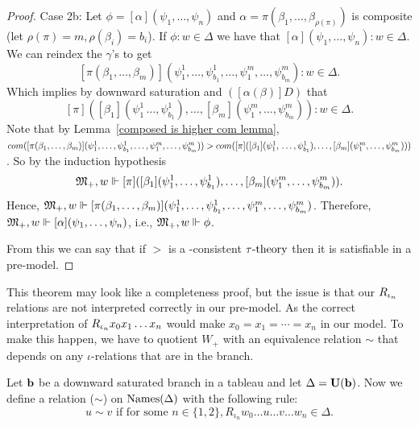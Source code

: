 \begin{proof}
    \par Case 2b: Let $\phi = [\alpha](\psi_1,\ldots,\psi_n)$ and $\alpha=\pi(\beta_1,\ldots,\beta_{\rho(\pi)})$ is composite (let $\rho(\pi)=m, \rho(\beta_i)=b_i$). If $\phi:w\in\Delta$ we have that $[\alpha](\psi_1,\ldots,\psi_n):w\in\Delta$.
    We can reindex the $\gamma$'s to get $$[\pi(\beta_1,\ldots,\beta_{m})](\psi_1^1,\ldots,\psi_{b_1}^1,\ldots,\psi_1^{m},\ldots,\psi_{b_m}^{m}):w\in\Delta.$$ Which implies by downward saturation and $([\alpha(\beta)]D)$ that $$[\pi]([\beta_1](\psi_1^1\,\ldots,\psi_{b_1}^1),\ldots,[\beta_m](\psi_1^{m},\ldots,\psi_{b_m}^{m})):w\in\Delta.$$ 
    Note that by Lemma~\ref{composed is higher com lemma}, $com([\pi(\beta_1,\ldots,\beta_{m})](\psi_1^1,\ldots,\psi_{b_1}^1,\ldots,\psi_1^{m},\ldots,\psi_{b_m}^{m})) > com([\pi]([\beta_1](\psi_1^1,
    \\ \ldots,\psi_{b_1}^1),\ldots,[\beta_m](\psi_1^{m},\ldots,\psi_{b_m}^{m})))$. 
    So by the induction hypothesis 
    $${\mathfrak{M}_+},w\Vdash[\pi]([\beta_1](\psi_1^1,\ldots,\psi_{b_1}^1),\ldots,[\beta_{m}](\psi_1^{m},\ldots,\psi_{b_m}^{m})).$$ Hence, ${\mathfrak{M}_+},w\Vdash[\pi(\beta_1,\ldots,\beta_{m})](\psi_1^1,\ldots,\psi_{b_1}^1, \ldots,\psi_1^{m},\ldots,\psi_{b_m}^{m})$. Therefore, ${\mathfrak{M}_+},w\Vdash[\alpha](\psi_1,\ldots,\psi_n)$, i.e., ${\mathfrak{M}_+},w\Vdash\phi$.
    \par From this we can say that if $\gt$ is a \pmt-consistent $\tau\text{-theory}$ then it is satisfiable in a pre-model.
\end{proof}

\par This theorem may look like a completeness proof, but the issue is that our $R_{\iota_n}$ relations are not interpreted correctly in our pre-model. As the correct interpretation of $R_{\iota_n} x_0x_1\ldots x_n$ would make $x_0=x_1=\cdots=x_n$ in our model. To make this happen, we have to quotient $W_+$ with an equivalence relation $\sim$ that depends on any $\iota$-relations that are in the branch.

\begin{definition}\label{flt equivalence rel}
    Let $\textbf{b}$ be a downward saturated branch in a tableau and let $\Delta=\textbf{U}(\textbf{b})$. Now we define a relation ($\sim$) on $\text{Names}(\Delta)$ with the following rule:
    \begin{equation*}
        u\sim v \text{ if for some } n\in\{1,2\}, R_{\iota_n}w_0\ldots u\ldots v \ldots w_n\in\Delta.
    \end{equation*}
\end{definition}

